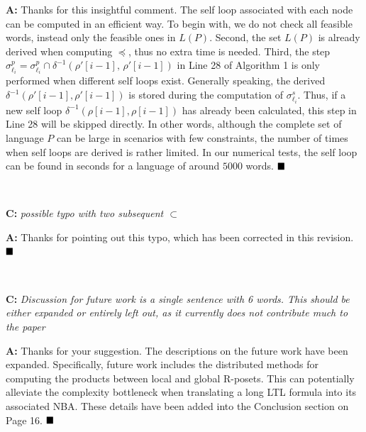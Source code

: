\documentclass[10pt]{article}
\begin{document}
\textbf{A:} Thanks for this insightful comment.
 The self loop associated with each node can be
computed in an efficient way.
To begin with, we do not check all feasible words,
instead only the feasible ones in $L(P)$.
Second, the set $L(P)$ is already derived
when computing $\preceq$, thus no extra time is needed.
Third, the step $\sigma^p_{\ell_i}=\sigma^p_{\ell_i}\cap\delta^{-1}(\rho'[i-1],\, \rho'[i-1])$
in Line 28 of Algorithm 1 is only performed when different self loops exist.
Generally speaking,
the derived $\delta^{-1}(\rho'[i-1],\rho'[i-1])$ is stored during
the computation of $\sigma^s_{\ell_i}$.
Thus, if a new self loop $\delta^{-1}(\rho[i-1], \rho[i-1])$ has already been calculated,
this step in Line 28 will be skipped directly.
In other words, although the complete set of language $P$ can be
large in scenarios with few constraints,
the number of times when self loops are derived is rather limited.
In our numerical tests,
the self loop can be found in seconds for a language of around
$5000$ words.
$\hfill\blacksquare$

\hspace*{\fill} \


\textbf{C:}
\emph{ possible typo with two subsequent $\subset$}

\textbf{A:} Thanks for pointing out this typo, which has been corrected in this revision.
$\hfill\blacksquare$

\hspace*{\fill} \

\textbf{C:}
\emph{ Discussion for future work is a single sentence with 6 words. This should be either expanded
	or entirely left out, as it currently does not contribute much to the paper}

\textbf{A:} Thanks for your suggestion.
The descriptions on the future
work have been expanded.  Specifically, future work includes the distributed methods for computing
the products between local and global R-posets.
This can potentially alleviate the complexity bottleneck
when translating a long LTL formula into its associated NBA.
These details have been added into the Conclusion section on Page 16.
$\hfill\blacksquare$
\end{document}
